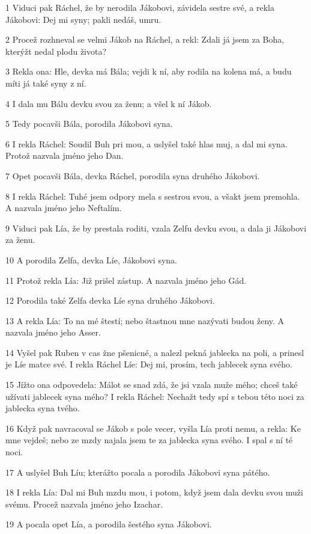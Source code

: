 \par 1 Viduci pak Ráchel, že by nerodila Jákobovi, závidela sestre své, a rekla Jákobovi: Dej mi syny; pakli nedáš, umru.
\par 2 Procež rozhneval se velmi Jákob na Ráchel, a rekl: Zdali já jsem za Boha, kterýžt nedal plodu života?
\par 3 Rekla ona: Hle, devka má Bála; vejdi k ní, aby rodila na kolena má, a budu míti já také syny z ní.
\par 4 I dala mu Bálu devku svou za ženu; a všel k ní Jákob.
\par 5 Tedy pocavši Bála, porodila Jákobovi syna.
\par 6 I rekla Ráchel: Soudil Buh pri mou, a uslyšel také hlas muj, a dal mi syna. Protož nazvala jméno jeho Dan.
\par 7 Opet pocavši Bála, devka Ráchel, porodila syna druhého Jákobovi.
\par 8 I rekla Ráchel: Tuhé jsem odpory mela s sestrou svou, a všakt jsem premohla. A nazvala jméno jeho Neftalím.
\par 9 Viduci pak Lía, že by prestala roditi, vzala Zelfu devku svou, a dala ji Jákobovi za ženu.
\par 10 A porodila Zelfa, devka Líe, Jákobovi syna.
\par 11 Protož rekla Lía: Již prišel zástup. A nazvala jméno jeho Gád.
\par 12 Porodila také Zelfa devka Líe syna druhého Jákobovi.
\par 13 A rekla Lía: To na mé štestí; nebo štastnou mne nazývati budou ženy. A nazvala jméno jeho Asser.
\par 14 Vyšel pak Ruben v cas žne pšenicné, a nalezl pekná jablecka na poli, a prinesl je Líe matce své. I rekla Ráchel Líe: Dej mi, prosím, tech jablecek syna svého.
\par 15 Jížto ona odpovedela: Málot se snad zdá, že jsi vzala muže mého; chceš také užívati jablecek syna mého? I rekla Ráchel: Nechažt tedy spí s tebou této noci za jablecka syna tvého.
\par 16 Když pak navracoval se Jákob s pole vecer, vyšla Lía proti nemu, a rekla: Ke mne vejdeš; nebo ze mzdy najala jsem te za jablecka syna svého. I spal s ní té noci.
\par 17 A uslyšel Buh Líu; kterážto pocala a porodila Jákobovi syna pátého.
\par 18 I rekla Lía: Dal mi Buh mzdu mou, i potom, když jsem dala devku svou muži svému. Procež nazvala jméno jeho Izachar.
\par 19 A pocala opet Lía, a porodila šestého syna Jákobovi.
